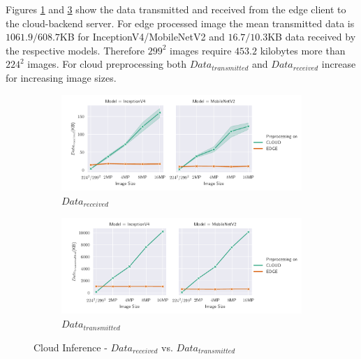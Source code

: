 Figures \ref{fig:CloudInferenceReceivedData} and \ref{fig:CloudInferenceTransmittedData} show the data transmitted and received from the edge client to the cloud-backend server.
For edge processed image the mean transmitted data is $1061.9/608.7$KB for InceptionV4/MobileNetV2 and $16.7/10.3$KB data received by the respective models.
Therefore $299^2$ images require $453.2$ kilobytes more than $224^2$ images.
For cloud preprocessing both $Data_{transmitted}$ and $Data_{received}$ increase for increasing image sizes.
\begin{figure}[H]
\centering
\begin{subfigure}[b]{0.95\textwidth}
   \includegraphics[width=1\linewidth]{./Bilder/single_plots/cloud_inference_plots/Cloud_Inference_Received_Data.pdf}
   \caption{$Data_{received}$}
   \label{fig:CloudInferenceReceivedData} 
\end{subfigure}

\begin{subfigure}[b]{0.95\textwidth}
   \includegraphics[width=1\linewidth]{./Bilder/single_plots/cloud_inference_plots/Cloud_Inference_Transmitted_Data.pdf}
   \caption{$Data_{transmitted}$}
   \label{fig:CloudInferenceTransmittedData}
\end{subfigure}

\caption{Cloud Inference -  $Data_{received}$ vs. $Data_{transmitted}$}
\end{figure}

